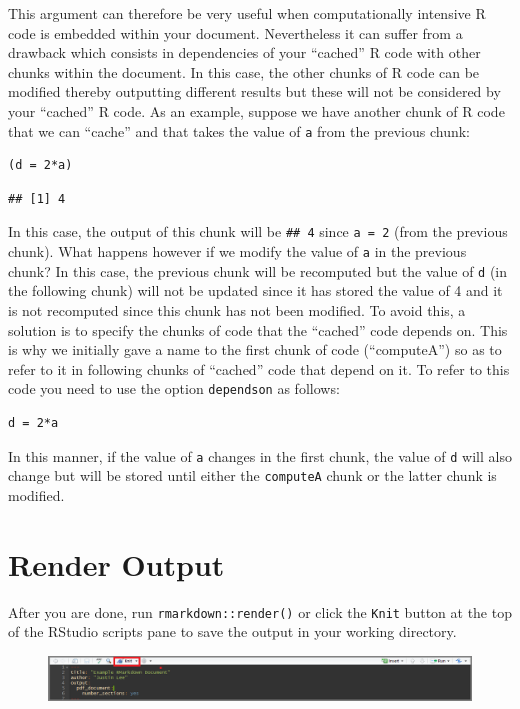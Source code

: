 \documentclass[]{book}
\theoremstyle{definition}
\theoremstyle{definition}
\theoremstyle{remark}
\begin{document}
This argument can therefore be very useful when computationally
intensive R code is embedded within your document. Nevertheless it can
suffer from a drawback which consists in dependencies of your ``cached''
R code with other chunks within the document. In this case, the other
chunks of R code can be modified thereby outputting different results
but these will not be considered by your ``cached'' R code. As an
example, suppose we have another chunk of R code that we can ``cache''
and that takes the value of \texttt{a} from the previous chunk:

\begin{verbatim}
(d = 2*a)
\end{verbatim}

\begin{verbatim}
## [1] 4
\end{verbatim}

In this case, the output of this chunk will be \texttt{\#\#\ 4} since
\texttt{a\ =\ 2} (from the previous chunk). What happens however if we
modify the value of \texttt{a} in the previous chunk? In this case, the
previous chunk will be recomputed but the value of \texttt{d} (in the
following chunk) will not be updated since it has stored the value of 4
and it is not recomputed since this chunk has not been modified. To
avoid this, a solution is to specify the chunks of code that the
``cached'' code depends on. This is why we initially gave a name to the
first chunk of code (``computeA'') so as to refer to it in following
chunks of ``cached'' code that depend on it. To refer to this code you
need to use the option \texttt{dependson} as follows:

\begin{verbatim}
d = 2*a
\end{verbatim}

In this manner, if the value of \texttt{a} changes in the first chunk,
the value of \texttt{d} will also change but will be stored until either
the \texttt{computeA} chunk or the latter chunk is modified.

\section{Render Output}\label{render-output}

After you are done, run \texttt{rmarkdown::render()} or click the
\texttt{Knit} button at the top of the RStudio scripts pane to save the
output in your working directory.

\begin{figure}[htbp]
\centering
\includegraphics{images/rmd_knit.png}
\caption{}
\end{figure}
\end{document}
